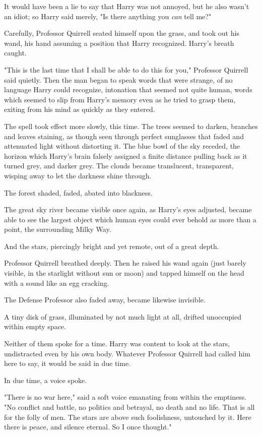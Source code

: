 It would have been a lie to say that Harry was not annoyed, but he also wasn't
an idiot; so Harry said merely, "Is there anything you \emph{can} tell me?"

Carefully, Professor Quirrell seated himself upon the grass, and took out his
wand, his hand assuming a position that Harry recognized. Harry's breath caught.

"This is the last time that I shall be able to do this for you," Professor
Quirrell said quietly. Then the man began to speak words that were strange, of
no language Harry could recognize, intonation that seemed not quite human,
words which seemed to slip from Harry's memory even as he tried to grasp them,
exiting from his mind as quickly as they entered.

The spell took effect more slowly, this time. The trees seemed to darken,
branches and leaves staining, as though seen through perfect sunglasses that
faded and attenuated light without distorting it. The blue bowl of the sky
receded, the horizon which Harry's brain falsely assigned a finite distance
pulling back as it turned grey, and darker grey. The clouds became translucent,
transparent, wisping away to let the darkness shine through.

The forest shaded, faded, abated into blackness.

The great sky river became visible once again, as Harry's eyes adjusted, became
able to see the largest object which human eyes could ever behold as more than
a point, the surrounding Milky Way.

And the stars, piercingly bright and yet remote, out of a great depth.

Professor Quirrell breathed deeply. Then he raised his wand again (just barely
visible, in the starlight without sun or moon) and tapped himself on the head
with a sound like an egg cracking.

The Defense Professor also faded away, became likewise invisible.

A tiny disk of grass, illuminated by not much light at all, drifted unoccupied
within empty space.

Neither of them spoke for a time. Harry was content to look at the stars,
undistracted even by his own body. Whatever Professor Quirrell had called him
here to say, it would be said in due time.

In due time, a voice spoke.

"There is no war here," said a soft voice emanating from within the emptiness.
"No conflict and battle, no politics and betrayal, no death and no life. That
is all for the folly of men. The stars are above such foolishness, untouched by
it. Here there is peace, and silence eternal. So I once thought."

